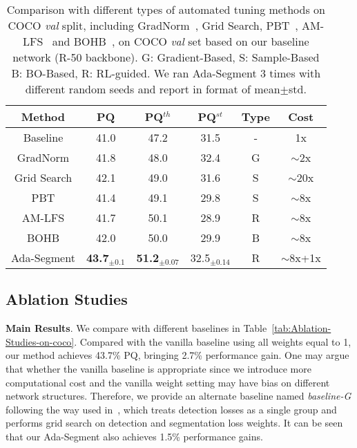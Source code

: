 \documentclass[letterpaper]{article} \usepackage{aaai21}  \usepackage{times}  \usepackage{helvet} \usepackage{courier}  \usepackage[hyphens]{url}  \usepackage{graphicx} \urlstyle{rm} \def\UrlFont{\rm}  \usepackage{natbib}  \usepackage{caption} \frenchspacing  \setlength{\pdfpagewidth}{8.5in}  \setlength{\pdfpageheight}{11in}
\begin{document}
\begin{table}[t]
  \begin{centering}
  \tabcolsep 0.02in\renewcommand{\arraystretch}{1.1}{\footnotesize{}}\begin{tabular}{c|ccc|c|c}
  \hline 
  Method & PQ & PQ$^{th}$ & PQ$^{st}$ & Type & Cost \tabularnewline
  \hline 
  \hline
  Baseline & 41.0 & 47.2 & 31.5 & - & 1x\tabularnewline
  \hline
  GradNorm & 41.8 & 48.0 & 32.4 & G & $\sim$2x\tabularnewline
  Grid Search & 42.1 & 49.0 & 31.6 & S & $\sim$20x\tabularnewline
  PBT & 41.4 & 49.1 & 29.8 & S & $\sim$8x\tabularnewline
  AM-LFS & 41.7 & 50.1 & 28.9 & R & $\sim$8x\tabularnewline
  BOHB & 42.0 & 50.0 & 29.9 & B & $\sim$8x\tabularnewline
  \hline
  Ada-Segment & \textbf{43.7}$_{\pm0.1}$ & \textbf{51.2}$_{\pm0.07}$ & 
  32.5$_{\pm0.14}$ & R & $\sim$8x+1x\tabularnewline
  \hline 
  \end{tabular}{\footnotesize\par}
  \par\end{centering}


  \caption{\label{tab:Searching-method}
  Comparison with different types of automated tuning methods on COCO \textit{val} split,
  including GradNorm~\cite{chen2017gradnorm}, Grid Search, PBT~\cite{jaderberg2017pbt}, 
  AM-LFS~\cite{li2019AMlfs} and BOHB~\cite{falkner2018bohb},
  on COCO \textit{val} set based
  on our baseline network (R-50 backbone). 
  G: Gradient-Based, S: Sample-Based B: BO-Based, R: RL-guided. 
  We ran Ada-Segment 3 times with different random seeds
  and report in format of mean$\pm$std.}
\end{table}


 \subsection{Ablation Studies}




\noindent
 \textbf{Main Results}.
 We compare with different baselines in Table~\ref{tab:Ablation-Studies-on-coco}. 
 Compared with the vanilla baseline using
 all weights equal to 1, our method achieves 43.7\% PQ, bringing 2.7\% performance gain. 
 One may argue that whether the vanilla baseline is appropriate since we introduce 
 more computational cost and the vanilla weight setting may have bias on different network structures. 
 Therefore, we provide an alternate baseline named \textit{baseline-G} 
 following the way used in~\cite{panopticFPNkirillov2019}, which treats detection losses
 as a single group and performs grid search on detection and segmentation loss weights. 
 It can be seen that our Ada-Segment also achieves 1.5\% performance gains.
\end{document}
